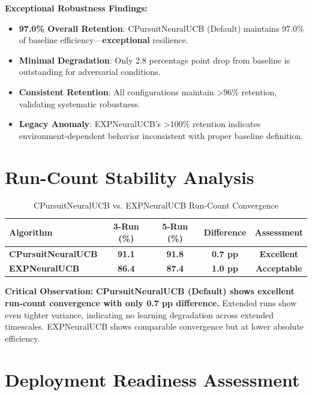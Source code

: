 \documentclass[12pt,a4paper]{article}
\newcommand{\success}[1]{\textcolor{accentgreen}{\textbf{#1}}}
\newcommand{\legacy}[1]{\textcolor{legacycolor}{\textbf{#1}}}
\begin{document}
\textbf{Exceptional Robustness Findings:}

\begin{itemize}
    \item \success{97.0\% Overall Retention}: CPursuitNeuralUCB (Default) maintains 97.0\% of baseline efficiency—\textbf{exceptional} resilience.
    \item \success{Minimal Degradation}: Only 2.8 percentage point drop from baseline is outstanding for adversarial conditions.
    \item \success{Consistent Retention}: All configurations maintain >96\% retention, validating systematic robustness.
    \item \legacy{Legacy Anomaly}: EXPNeuralUCB's >100\% retention indicates environment-dependent behavior inconsistent with proper baseline definition.
\end{itemize}

\section{Run-Count Stability Analysis}

\begin{table}[H]
\centering
\caption{CPursuitNeuralUCB vs. EXPNeuralUCB Run-Count Convergence}
\begin{tabular}{@{}lcccc@{}}
\toprule
\textbf{Algorithm} & \textbf{3-Run (\%)} & \textbf{5-Run (\%)} & \textbf{Difference} & \textbf{Assessment} \\
\midrule
\success{CPursuitNeuralUCB} & \success{91.1} & \success{91.8} & \success{0.7 pp} & \success{Excellent} \\
\legacy{EXPNeuralUCB} & \legacy{86.4} & \legacy{87.4} & \legacy{1.0 pp} & \legacy{Acceptable} \\
\bottomrule
\end{tabular}
\end{table}

\textbf{Critical Observation:} \success{CPursuitNeuralUCB (Default) shows excellent run-count convergence with only 0.7 pp difference.} Extended runs show even tighter variance, indicating no learning degradation across extended timescales. EXPNeuralUCB shows comparable convergence but at lower absolute efficiency.

\section{Deployment Readiness Assessment}
\end{document}
